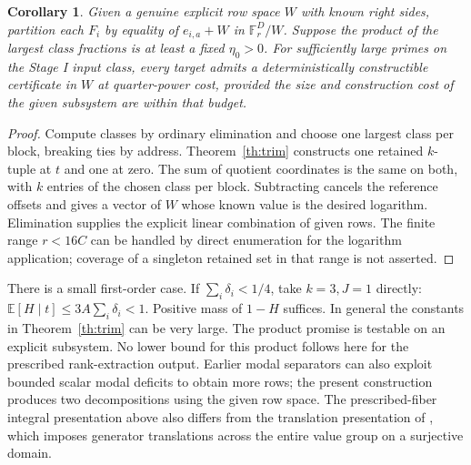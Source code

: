 \documentclass[11pt]{article}
\newtheorem{corollary}[theorem]{Corollary}
\newcommand{\F}{\mathbb F}
\begin{document}
\begin{corollary}\label{cor:construct}
Given a genuine explicit row space $W$ with known right sides, partition each $F_i$ by equality of $e_{i,a}+W$ in $\F_r^D/W$. Suppose the product of the largest class fractions is at least a fixed $\eta_0>0$. For sufficiently large primes on the Stage I input class, every target admits a deterministically constructible certificate in $W$ at quarter-power cost, provided the size and construction cost of the given subsystem are within that budget.
\end{corollary}
\begin{proof}
Compute classes by ordinary elimination and choose one largest class per block, breaking ties by address. Theorem~\ref{th:trim} constructs one retained $k$-tuple at $t$ and one at zero. The sum of quotient coordinates is the same on both, with $k$ entries of the chosen class per block. Subtracting cancels the reference offsets and gives a vector of $W$ whose known value is the desired logarithm. Elimination supplies the explicit linear combination of given rows. The finite range $r<16C$ can be handled by direct enumeration for the logarithm application; coverage of a singleton retained set in that range is not asserted.
\end{proof}

There is a small first-order case. If $\sum_i\delta_i<1/4$, take $k=3,J=1$ directly: $\mathbb E[H\mid t]\le3A\sum_i\delta_i<1$. Positive mass of $1-H$ suffices. In general the constants in Theorem~\ref{th:trim} can be very large. The product promise is testable on an explicit subsystem. No lower bound for this product follows here for the prescribed rank-extraction output. Earlier modal separators can also exploit bounded scalar modal deficits to obtain more rows; the present construction produces two decompositions using the given row space. The prescribed-fiber integral presentation above also differs from the translation presentation of \cite{long}, which imposes generator translations across the entire value group on a surjective domain.
\end{document}
